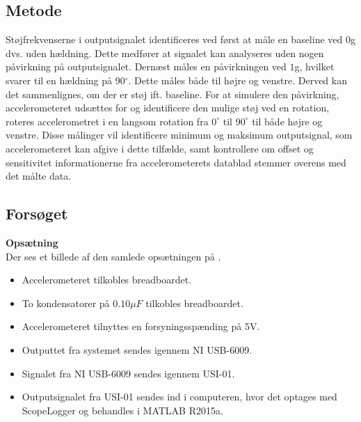 \subsection{Metode}
Støjfrekvenserne i outputsignalet identificeres ved først at måle en baseline ved $0$g dvs. uden hældning. Dette medfører at signalet kan analyseres uden nogen påvirkning på outputsignalet. Dernæst måles en påvirkningen ved $1$g, hvilket svarer til en hældning på 90$^{\circ}$. Dette måles både til højre og venstre. Derved kan det sammenlignes, om der er støj ift. baseline. %
For at simulere den påvirkning, accelerometeret udsættes for og identificere den mulige støj ved en rotation, roteres accelerometret i en langsom rotation fra $0^{\circ}$ til $90^{\circ}$ til både højre og venstre. Disse målinger vil identificere minimum og maksimum outputsignal, som accelerometeret kan afgive i dette tilfælde, samt kontrollere om offset og sensitivitet informationerne fra accelerometerets datablad stemmer overens med det målte data.

\subsection{Forsøget}
\textbf{Opsætning}\\
Der ses et billede af den samlede opsætningen på .
\begin{itemize}
\item Accelerometeret tilkobles breadboardet.
\item To kondensatorer på $0.10 \mu F$ tilkobles breadboardet. 
\item Accelerometeret tilnyttes en forsyningsspænding på 5V.
\item Outputtet fra systemet sendes igennem NI USB-6009.
\item Signalet fra NI USB-6009 sendes igennem USI-01. 
\item Outputsignalet fra USI-01 sendes ind i computeren, hvor det optages med ScopeLogger og behandles i MATLAB R2015a.
\end{itemize}

